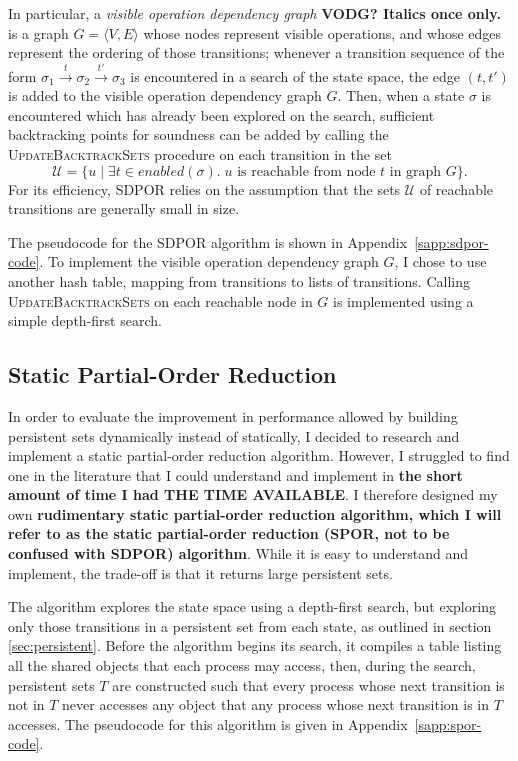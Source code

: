 \documentclass[12pt,a4paper,twoside,openright]{report}
\begin{document}
In particular, a \emph{visible operation dependency
graph} \textbf{VODG? Italics once only.} is a graph $G = \langle V, E \rangle$ whose
nodes represent visible operations, and whose edges
represent the ordering of those transitions; whenever
a transition sequence of the form
$\sigma_1 \xrightarrow{t} \sigma_2 \xrightarrow{t'}
 \sigma_3$
is encountered in a search of the state space, the
edge $(t, t')$ is added to the visible operation
dependency graph $G$. Then, when a state $\sigma$ is
encountered which has already been explored on the
search, sufficient backtracking points for soundness
can be added by calling the
\textsc{UpdateBacktrackSets} procedure
on each transition in the set
\[\mathcal{U} = \{u \mid \exists t \in \textit{enabled}(\sigma).\;
   u \text{ is reachable from node } t \text{ in graph } G\}.\]
For its efficiency, SDPOR relies on the assumption that
the sets $\mathcal{U}$ of reachable transitions
are generally small in size.

The pseudocode for the SDPOR algorithm is shown
in Appendix~\ref{sapp:sdpor-code}.
To implement the visible operation dependency graph
$G$, I chose to use another hash table,
mapping from transitions to lists of transitions.
Calling \textsc{UpdateBacktrackSets} on
each reachable node in $G$ is implemented using
a simple depth-first search.

\subsection{Static Partial-Order Reduction}
\label{sec:spor-imp}

In order to evaluate the improvement in performance
allowed by building persistent sets dynamically
instead of statically, I decided to research and
implement a static partial-order reduction
algorithm. However, I struggled to find one
in the literature that I could
understand and implement in \textbf{the short amount
of time I had THE TIME AVAILABLE}. I therefore designed my own
\textbf{rudimentary static partial-order reduction algorithm,
which I will refer to as the static partial-order reduction
(SPOR, not to be confused with SDPOR) algorithm}.
While it is easy to understand and implement,
the trade-off is that it returns large persistent sets.

The algorithm explores the state space using a
depth-first search, but exploring only those
transitions in a persistent set from each
state, as outlined in section \ref{sec:persistent}.
Before the algorithm begins its search, it compiles a table
listing all the shared objects that each process may
access, then, during the search, persistent sets $T$ are
constructed such that
every process whose next transition is
not in $T$ never accesses any
object that any process whose next
transition is in $T$ accesses.
The pseudocode for this algorithm is
given in Appendix~\ref{sapp:spor-code}.
\end{document}
